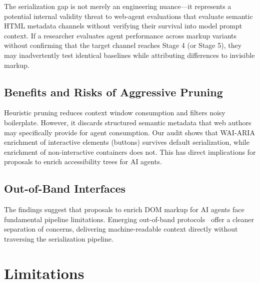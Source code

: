 \documentclass[conference]{IEEEtran}
\begin{document}
The serialization gap is not merely an engineering nuance---it represents a potential internal validity threat to web-agent evaluations that evaluate semantic HTML metadata channels without verifying their survival into model prompt context. If a researcher evaluates agent performance across markup variants without confirming that the target channel reaches Stage 4 (or Stage 5), they may inadvertently test identical baselines while attributing differences to invisible markup.

\subsection{Benefits and Risks of Aggressive Pruning}

Heuristic pruning reduces context window consumption and filters noisy boilerplate. However, it discards structured semantic metadata that web authors may specifically provide for agent consumption. Our audit shows that WAI-ARIA enrichment of interactive elements (buttons) survives default serialization, while enrichment of non-interactive containers does not. This has direct implications for proposals to enrich accessibility trees for AI agents.

\subsection{Out-of-Band Interfaces}

The findings suggest that proposals to enrich DOM markup for AI agents face fundamental pipeline limitations. Emerging out-of-band protocols~\cite{llmstxt2024, mcp2024} offer a cleaner separation of concerns, delivering machine-readable context directly without traversing the serialization pipeline.

\section{Limitations}
\label{sec:limitations}
\end{document}
